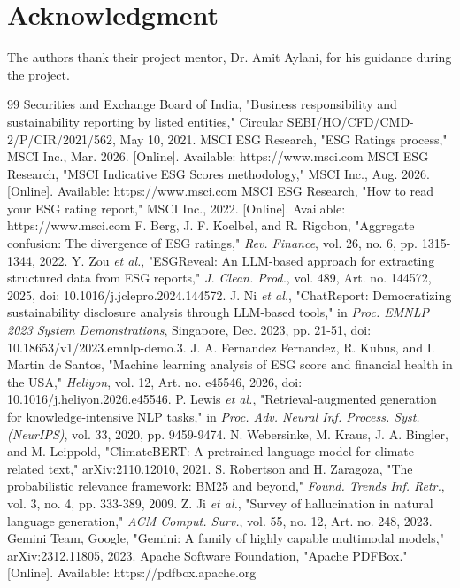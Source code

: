 \documentclass[conference]{IEEEtran}
\begin{document}
\section*{Acknowledgment}The authors thank their project mentor, Dr. Amit Aylani, for his guidance during the project.
\begin{thebibliography}{99}
 Securities and Exchange Board of India, "Business responsibility and sustainability reporting by listed entities," Circular SEBI/HO/CFD/CMD-2/P/CIR/2021/562, May 10, 2021.
 MSCI ESG Research, "ESG Ratings process," MSCI Inc., Mar. 2026. [Online]. Available: https://www.msci.com
 MSCI ESG Research, "MSCI Indicative ESG Scores methodology," MSCI Inc., Aug. 2026. [Online]. Available: https://www.msci.com
 MSCI ESG Research, "How to read your ESG rating report," MSCI Inc., 2022. [Online]. Available: https://www.msci.com
 F. Berg, J. F. Koelbel, and R. Rigobon, "Aggregate confusion: The divergence of ESG ratings," \textit{Rev. Finance}, vol. 26, no. 6, pp. 1315-1344, 2022.
 Y. Zou \textit{et al.}, "ESGReveal: An LLM-based approach for extracting structured data from ESG reports," \textit{J. Clean. Prod.}, vol. 489, Art. no. 144572, 2025, doi: 10.1016/j.jclepro.2024.144572.
 J. Ni \textit{et al.}, "ChatReport: Democratizing sustainability disclosure analysis through LLM-based tools," in \textit{Proc. EMNLP 2023 System Demonstrations}, Singapore, Dec. 2023, pp. 21-51, doi: 10.18653/v1/2023.emnlp-demo.3.
 J. A. Fernandez Fernandez, R. Kubus, and I. Martin de Santos, "Machine learning analysis of ESG score and financial health in the USA," \textit{Heliyon}, vol. 12, Art. no. e45546, 2026, doi: 10.1016/j.heliyon.2026.e45546.
 P. Lewis \textit{et al.}, "Retrieval-augmented generation for knowledge-intensive NLP tasks," in \textit{Proc. Adv. Neural Inf. Process. Syst. (NeurIPS)}, vol. 33, 2020, pp. 9459-9474.
 N. Webersinke, M. Kraus, J. A. Bingler, and M. Leippold, "ClimateBERT: A pretrained language model for climate-related text," arXiv:2110.12010, 2021.
 S. Robertson and H. Zaragoza, "The probabilistic relevance framework: BM25 and beyond," \textit{Found. Trends Inf. Retr.}, vol. 3, no. 4, pp. 333-389, 2009.
 Z. Ji \textit{et al.}, "Survey of hallucination in natural language generation," \textit{ACM Comput. Surv.}, vol. 55, no. 12, Art. no. 248, 2023.
 Gemini Team, Google, "Gemini: A family of highly capable multimodal models," arXiv:2312.11805, 2023.
 Apache Software Foundation, "Apache PDFBox." [Online]. Available: https://pdfbox.apache.org
\end{thebibliography}
\end{document}
